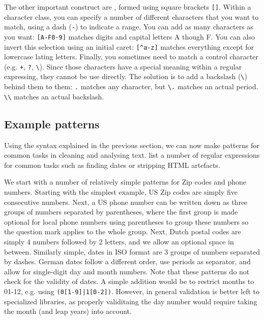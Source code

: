 The other important construct are , formed using square brackets \verb|[]|.
Within a character class, you can specify a number of different characters that you want to match, using a dash (\verb|-|) to indicate a range.
You can add as many characters as you want: \verb|[A-F0-9]| matches digits and capital letters A though F.
You can also invert this selection using an initial caret: \verb|[^a-z]| matches everything except for lowercase lating letters.
Finally, you sometimes need to match a control character  (e.g. \verb!+!, \verb|?|, \verb|\|). Since those characters have a special meaning within a regular expressing, they cannot be use directly. The solution is to add a backslash (\verb|\|) behind them to  them:
\verb|.| matches any character, but \verb|\.| matches an actual period. \verb|\\| matches an actual backslash.

\subsection{Example patterns}

Using the syntax explained in the previous section, we can now make patterns for common tasks in cleaning and analysing text.
 list a number of regular expressions for common tasks such as finding dates or stripping HTML artefacts.



We start with a number of relatively simple patterns for Zip codes and phone numbers.
Starting with the simplest example, US Zip codes are simply five consecutive numbers.
Next, a US phone number can be written down as three groups of numbers separated by parentheses,
where the first group is made optional for local phone numbers using parentheses to group these numbers so the question mark applies to the whole group. 
Next, Dutch postal codes are simply 4 numbers followed by 2 letters, and we allow an optional space in between.
Similarly simple, dates in ISO format are 3 groups of numbers separated by dashes.
German dates follow a different order, use periods as separator, and allow for single-digit day and month numbers.
Note that these patterns do not check for the validity of dates.
A simple addition would be to restrict months to 01-12, e.g. using \verb!(0[1-9]|1[0-2])!.
However, in general validation is better left to specialized libraries, as properly validitaing the day number would require taking the month (and leap years) into account. 

